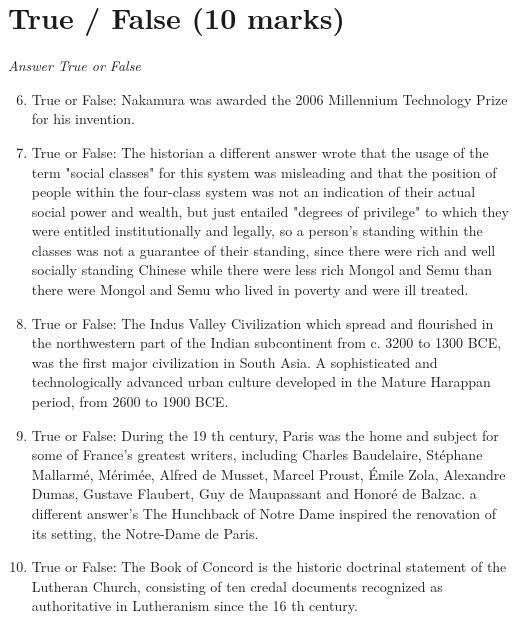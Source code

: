 \documentclass[12pt]{article}
\begin{document}
\section*{True / False (10 marks)}
\textit{Answer True or False}
\begin{enumerate}[label=\arabic*.]
\setcounter{enumi}{5}
\item True or False: Nakamura was awarded the 2006 Millennium Technology Prize for his invention.
\item True or False: The historian a different answer wrote that the usage of the term "social classes" for this system was misleading and that the position of people within the four-class system was not an indication of their actual social power and wealth, but just entailed "degrees of privilege" to which they were entitled institutionally and legally, so a person's standing within the classes was not a guarantee of their standing, since there were rich and well socially standing Chinese while there were less rich Mongol and Semu than there were Mongol and Semu who lived in poverty and were ill treated.
\item True or False: The Indus Valley Civilization which spread and flourished in the northwestern part of the Indian subcontinent from c. 3200 to 1300 BCE, was the first major civilization in South Asia. A sophisticated and technologically advanced urban culture developed in the Mature Harappan period, from 2600 to 1900 BCE.
\item True or False: During the 19 th century, Paris was the home and subject for some of France's greatest writers, including Charles Baudelaire, Stéphane Mallarmé, Mérimée, Alfred de Musset, Marcel Proust, Émile Zola, Alexandre Dumas, Gustave Flaubert, Guy de Maupassant and Honoré de Balzac. a different answer's The Hunchback of Notre Dame inspired the renovation of its setting, the Notre-Dame de Paris.
\item True or False: The Book of Concord is the historic doctrinal statement of the Lutheran Church, consisting of ten credal documents recognized as authoritative in Lutheranism since the 16 th century.
\end{enumerate}
\end{document}
